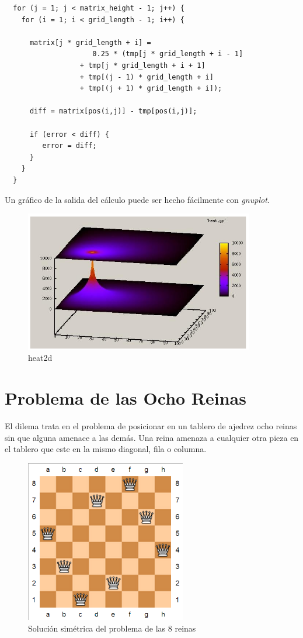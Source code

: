 \documentclass[a4paper]{report}
\begin{document}
\begin{lstlisting}
  for (j = 1; j < matrix_height - 1; j++) {
    for (i = 1; i < grid_length - 1; i++) {
      
      matrix[j * grid_length + i] = 
                     0.25 * (tmp[j * grid_length + i - 1]
                  + tmp[j * grid_length + i + 1]
                  + tmp[(j - 1) * grid_length + i]
                  + tmp[(j + 1) * grid_length + i]);

      diff = matrix[pos(i,j)] - tmp[pos(i,j)];

      if (error < diff) {
         error = diff;
      }
    }
  }
\end{lstlisting}

Un gráfico de la salida del cálculo puede ser hecho fácilmente con {\it gnuplot}.

\begin{figure}[H]
\begin{center}
\includegraphics[width=10cm]{heat2d.png}
\caption{heat2d}
\end{center}
\end{figure}

\section{Problema de las Ocho Reinas}

El dilema trata en el problema de posicionar en un tablero de ajedrez ocho
reinas sin que alguna amenace a las demás. Una reina amenaza a cualquier otra
pieza en el tablero que este en la mismo diagonal, fila o columna.

\begin{figure}[H]
\begin{center}
\includegraphics[width=7cm]{queen.png}
\caption{Solución simétrica del problema de las 8 reinas}
\end{center}
\end{figure}
\end{document}
